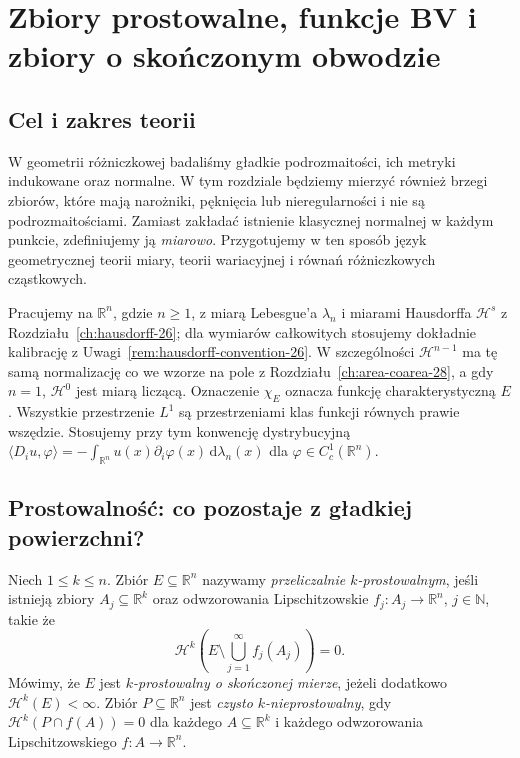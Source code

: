 \chapter[Prostowalność i zbiory o skończonym obwodzie]{Zbiory prostowalne, funkcje BV i zbiory o skończonym obwodzie}
\label{ch:geometric-measure-29}

\providecommand{\atlasref}[2]{#2}


\section{Cel i zakres teorii}
W geometrii różniczkowej badaliśmy gładkie podrozmaitości, ich
metryki indukowane oraz normalne. W tym rozdziale będziemy mierzyć
również brzegi zbiorów, które mają narożniki, pęknięcia lub
nieregularności i nie są podrozmaitościami. Zamiast zakładać
istnienie klasycznej normalnej w każdym punkcie, zdefiniujemy ją
\emph{miarowo}. Przygotujemy w ten sposób język geometrycznej
teorii miary, teorii wariacyjnej i równań różniczkowych cząstkowych.

Pracujemy na $\mathbb R^n$, gdzie $n\ge1$, z miarą Lebesgue'a
$\lambda_n$ i miarami Hausdorffa $\mathcal H^s$
z Rozdziału~\ref{ch:hausdorff-26}; dla wymiarów
całkowitych stosujemy dokładnie kalibrację
z Uwagi~\ref{rem:hausdorff-convention-26}.
W szczególności $\mathcal H^{n-1}$ ma tę samą
normalizację co we wzorze na pole z
Rozdziału~\ref{ch:area-coarea-28}, a gdy $n=1$,
$\mathcal H^0$ jest miarą liczącą. Oznaczenie $\chi_E$ oznacza
funkcję charakterystyczną $E$. Wszystkie przestrzenie $L^1$
są przestrzeniami klas funkcji równych prawie wszędzie.
Stosujemy przy tym konwencję dystrybucyjną
$\langle D_i u,\varphi\rangle=-\int_{\mathbb R^n}u(x)
\partial_i\varphi(x)\,\mathrm d\lambda_n(x)$ dla
$\varphi\in C_c^1(\mathbb R^n)$.

\section{Prostowalność: co pozostaje z gładkiej powierzchni?}
\begin{definicja}
\label{def:rectifiable-29}
Niech $1\le k\le n$. Zbiór $E\subseteq\mathbb R^n$ nazywamy
\emph{przeliczalnie $k$-prostowalnym}, jeśli istnieją
zbiory $A_j\subseteq\mathbb R^k$ oraz odwzorowania
Lipschitzowskie $f_j:A_j\to\mathbb R^n$, $j\in\mathbb N$,
takie że
\[
 \mathcal H^k\!\left(E\setminus\bigcup_{j=1}^\infty f_j(A_j)\right)=0.
\]
Mówimy, że $E$ jest \emph{$k$-prostowalny o skończonej mierze},
jeżeli dodatkowo $\mathcal H^k(E)<\infty$.
Zbiór $P\subseteq\mathbb R^n$ jest \emph{czysto
$k$-nieprostowalny}, gdy
$\mathcal H^k(P\cap f(A))=0$ dla każdego
$A\subseteq\mathbb R^k$ i każdego odwzorowania
Lipschitzowskiego $f:A\to\mathbb R^n$.
\end{definicja}

